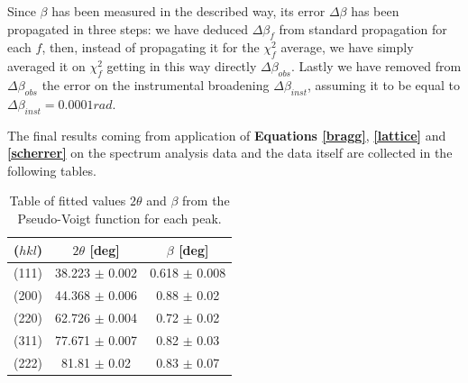 \documentclass[twocolumn]{article}
\begin{document}
\begin{multicols}{2}
Since $\beta$ has been measured in the described way, its error $\Delta \beta$ has been propagated in three steps: we have deduced $\Delta \beta_f$ from standard propagation for each $f$, then, instead of propagating it for the $\chi^2_f$ average, we have simply averaged it on $\chi^2_f$ getting in this way directly $\Delta \beta_{obs}$. Lastly we have removed from $\Delta \beta_{obs}$ the error on the instrumental broadening $\Delta \beta_{inst}$, assuming it to be equal to $\Delta \beta_{inst} = 0.0001 rad$.

The final results coming from application of {\bf Equations \ref{bragg}}, {\bf \ref{lattice}} and {\bf \ref{scherrer}} on the spectrum analysis data and the data itself are collected in the following tables. 
\begin{table}[H]
    \centering
    \begin{tabular}{c c c}
         ($hkl$) & {\bf $2\theta$} [deg] & {\bf $\beta$} [deg] \\
        \hline
        \hline
         (111) & 38.223 $\pm$ 0.002 &  0.618 $\pm$ 0.008 \\
         (200) & 44.368 $\pm$ 0.006 & 0.88 $\pm$ 0.02 \\
         (220) & 62.726 $\pm$ 0.004 & 0.72 $\pm$ 0.02 \\
         (311) & 77.671 $\pm$ 0.007 & 0.82 $\pm$ 0.03 \\
         (222) & 81.81 $\pm$ 0.02 & 0.83 $\pm$ 0.07  \\
         \hline
    \end{tabular}
    \caption{Table of fitted values $2\theta$ and $\beta$ from the Pseudo-Voigt function for each peak.}
    \label{tab:my_label}
\end{table}


\end{multicols}
\end{document}
